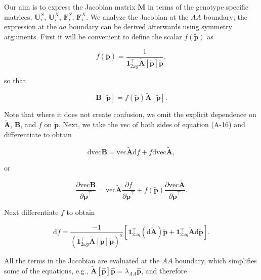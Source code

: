 \documentclass[11pt]{article}
\def\mbf#1{\mathbf{#1}}
\begin{document}
Our aim is to express the Jacobian matrix $\mbf{M}$ in terms of the genotype specific matrices, $\mbf{U}^S_i$, $\mbf{U}^X_i$, $\mbf{F}^S_i$, $\mbf{F}^X_i$. We analyze the Jacobian at the $AA$ boundary; the expression at the $aa$ boundary can be derived afterwards using symmetry arguments. First it will be convenient to define the scalar $f(\tilde{\mbf{p}})$ as

\begin{equation}
	f(\tilde{\mbf{p}}) = \frac{1}{ \mbf{1}^{\intercal}_{2 \omega g} \tilde{\mbf{A}}[\tilde{\mbf{p}}] \tilde{\mbf{p}}},
\end{equation}

\noindent so that

\begin{equation}
	\mbf{B}[\tilde{\mbf{p}}] = f(\tilde{\mbf{p}}) \tilde{\mbf{A}}[\tilde{\mbf{p}}].
\end{equation}

\noindent Note that where it does not create confusion, we omit the explicit dependence on $\tilde{\mbf{A}}$, $\mbf{B}$, and $f$ on $\tilde{\mbf{p}}$. Next, we take the vec of both sides of equation (A-16) and differentiate to obtain

\begin{equation} \label{eq:dvecB}
	\text{dvec} \mbf{B} = \text{vec} \tilde{\mbf{A}} \text{d} f + f \text{dvec} \tilde{\mbf{A}},
\end{equation}

\noindent or

\begin{equation}
	\frac{\partial \text{vec} \mbf{B}} {\partial \tilde{\mbf{p}}^{\intercal}} = \text{vec} \tilde{\mbf{A}} \frac{\partial f}{\partial \tilde{\mbf{p}}^{\intercal} } + f(\tilde{\mbf{p}}) \frac{ \partial \text{vec} \tilde{\mbf{A}} }{ \partial \tilde{\mbf{p}}^{\intercal} }.
\end{equation}

\noindent Next differentiate $f$ to obtain

\begin{equation}
	\text{d} f = \frac{ -1 }{ \left( \mbf{1}^{\intercal}_{2 \omega g} \tilde{\mbf{A}}[\tilde{\mbf{p}}] \tilde{\mbf{p}} \right)^2 } \left[ \mbf{1}^{\intercal}_{2 \omega g} \left( \text{d} \tilde{\mbf{A}} \right) \tilde{\mbf{p}} + \mbf{1}^{\intercal}_{2 \omega g} \tilde{\mbf{A}} \text{d} \tilde{\mbf{p}} \right].
\end{equation}

\noindent All the terms in the Jacobian are evaluated at the $AA$ boundary, which simplifies some of the equations, e.g., $\tilde{\mbf{A}}[ \hat{\mbf{p}} ] \hat{\mbf{p}} = \lambda_{AA} \hat{\mbf{p}}$, and therefore 
\end{document}
